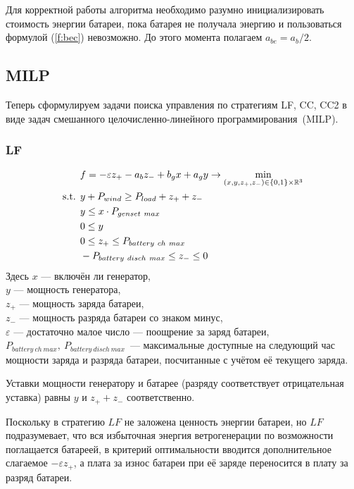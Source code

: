\documentclass{report}
\def \R {\mathbb{R}}
\def \eps {\varepsilon}
\begin{document}
Для корректной работы алгоритма необходимо разумно инициализировать стоимость энергии батареи, пока батарея не получала энергию и пользоваться формулой (\ref{f:bec}) невозможно.
До этого момента полагаем $a_{be} = a_b / 2$.

\subsection{MILP}
Теперь сформулируем задачи поиска управления по стратегиям LF, CC, CC2 в виде задач смешанного целочисленно-линейного программирования~(MILP).

\subsubsection{LF}
\label{sub:lf}
\begin{equation}\label{f:lf}
\begin{split}
\vspace{-4mm}
&f = -\eps z_+ - a_b z_- 
+ b_g x + a_g y
\rightarrow \min\limits_{(x, y, z_+, z_-) \in \{0,1\} \times \R^3 }\\
\text{s.t. }& y + P_{wind} \geq P_{load} + z_+ + z_-\\
&y \leq x \cdot P_{genset~max}\\
&0 \leq y \\
&0 \leq z_+ \leq P_{battery~ch~max} \\
&-P_{battery~disch~max} \leq z_- \leq 0 \\
\end{split}
\end{equation}
Здесь $x$ --- включён ли генератор,\\
$y$ --- мощность генератора,\\
$z_+$ --- мощность заряда батареи,\\
$z_-$ --- мощность разряда батареи со знаком минус,\\
$\eps$ --- достаточно малое число --- поощрение за заряд батареи,\\
$P_{battery~ch~max},~P_{battery~disch~max}$~--- максимальные доступные на следующий час мощности заряда и разряда батареи, посчитанные с учётом её текущего заряда.

Уставки мощности генератору и батарее (разряду соответствует отрицательная уставка) равны $y$ и $z_+ + z_-$ соответственно.

Поскольку в стратегию $LF$ не заложена ценность энергии батареи, но $LF$ подразумевает, что вся избыточная энергия ветрогенерации по возможности поглащается батареей, в критерий оптимальности вводится дополнительное слагаемое $-\eps z_+$, а плата за износ батареи при её заряде переносится в плату за разряд батареи.
\end{document}

